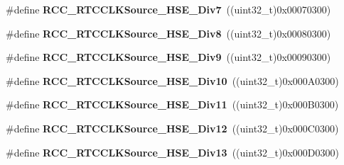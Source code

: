\begin{DoxyCompactItemize}
\item 
\mbox{\label{group___r_c_c___r_t_c___clock___source_ga0946a047841e00ea76dc61bf47410539}} 
\#define {\bfseries R\+C\+C\+\_\+\+R\+T\+C\+C\+L\+K\+Source\+\_\+\+H\+S\+E\+\_\+\+Div7}~((uint32\+\_\+t)0x00070300)
\item 
\mbox{\label{group___r_c_c___r_t_c___clock___source_ga4deb6eb4a2c3aa43298457b83e3bb637}} 
\#define {\bfseries R\+C\+C\+\_\+\+R\+T\+C\+C\+L\+K\+Source\+\_\+\+H\+S\+E\+\_\+\+Div8}~((uint32\+\_\+t)0x00080300)
\item 
\mbox{\label{group___r_c_c___r_t_c___clock___source_ga4c26192c5c048a7e24e0967dcb298eaf}} 
\#define {\bfseries R\+C\+C\+\_\+\+R\+T\+C\+C\+L\+K\+Source\+\_\+\+H\+S\+E\+\_\+\+Div9}~((uint32\+\_\+t)0x00090300)
\item 
\mbox{\label{group___r_c_c___r_t_c___clock___source_ga4f1882bdc54a174aca7fc156d77f8e28}} 
\#define {\bfseries R\+C\+C\+\_\+\+R\+T\+C\+C\+L\+K\+Source\+\_\+\+H\+S\+E\+\_\+\+Div10}~((uint32\+\_\+t)0x000\+A0300)
\item 
\mbox{\label{group___r_c_c___r_t_c___clock___source_gac030c1d9ac86ae5e316defb04fedf136}} 
\#define {\bfseries R\+C\+C\+\_\+\+R\+T\+C\+C\+L\+K\+Source\+\_\+\+H\+S\+E\+\_\+\+Div11}~((uint32\+\_\+t)0x000\+B0300)
\item 
\mbox{\label{group___r_c_c___r_t_c___clock___source_ga84d64801f6cbd3b6e34a7fd39b3b2a9e}} 
\#define {\bfseries R\+C\+C\+\_\+\+R\+T\+C\+C\+L\+K\+Source\+\_\+\+H\+S\+E\+\_\+\+Div12}~((uint32\+\_\+t)0x000\+C0300)
\item 
\mbox{\label{group___r_c_c___r_t_c___clock___source_gaf2636533562cbd222db0ae0214708292}} 
\#define {\bfseries R\+C\+C\+\_\+\+R\+T\+C\+C\+L\+K\+Source\+\_\+\+H\+S\+E\+\_\+\+Div13}~((uint32\+\_\+t)0x000\+D0300)
\item 
\mbox{\label{group___r_c_c___r_t_c___clock___source_gabc1ee689e8f45e2a8a5e037f9b931628}} 

\end{DoxyCompactItemize}
